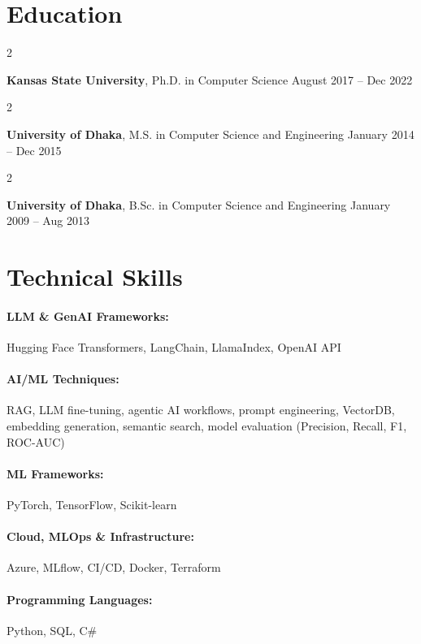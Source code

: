 \documentclass[10pt, letterpaper]{article}
\newenvironment{twocolentry}[2][]{
    \onecolentry
    \def\secondColumn{#2}
    \setcolumnwidth{\fill, 4.5 cm}
    \begin{paracol}{2}
}{
    \switchcolumn \raggedleft \secondColumn
    \end{paracol}
    \endonecolentry
} %
\begin{document}
\section{Education}

        \begin{twocolentry}{
            August 2017 -- Dec 2022
        }
            \textbf{Kansas State University}, Ph.D. in Computer Science\end{twocolentry}

        \begin{twocolentry}{
            January 2014 -- Dec 2015
        }
            \textbf{University of Dhaka}, M.S. in Computer Science and Engineering\end{twocolentry}

        \begin{twocolentry}{
            January 2009 -- Aug 2013
        }
            \textbf{University of Dhaka}, B.Sc. in Computer Science and Engineering\end{twocolentry}

\vspace{-1.5mm}
\section{Technical Skills}

        \paragraph{LLM \& GenAI Frameworks:} Hugging Face Transformers, LangChain, LlamaIndex, OpenAI API
        \vspace{-4mm}
        \paragraph{AI/ML Techniques:} RAG, LLM fine-tuning, agentic AI workflows, prompt engineering, VectorDB, embedding generation, semantic search, model evaluation (Precision, Recall, F1, ROC-AUC)
        \vspace{-4mm}
        \paragraph{ML Frameworks:} PyTorch, TensorFlow, Scikit-learn
        \vspace{-4mm}
        \paragraph{Cloud, MLOps \& Infrastructure:} Azure, MLflow, CI/CD, Docker, Terraform
        \vspace{-4mm}
        \paragraph{Programming Languages:} Python, SQL, C\#
\end{document}
